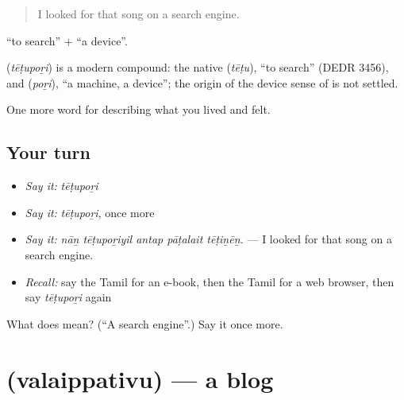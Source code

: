 \begin{quote}
I looked for that song on a search engine.
\end{quote}

 \textquotedblleft{}to search\textquotedblright{} +  \textquotedblleft{}a device\textquotedblright{}.

\begin{cousinweb}
\textbf{} (\emph{tēṭupoṟi}) is a modern compound: the native  (\emph{tēṭu}), \textquotedblleft{}to search\textquotedblright{} (DEDR 3456), and  (\emph{poṟi}), \textquotedblleft{}a machine, a device\textquotedblright{}; the origin of the device sense of  is not settled.
\end{cousinweb}

\begin{grammarlens}[title={What you've built}]
One more word for describing what you lived and felt.
\end{grammarlens}

\subsection*{Your turn}
\begin{itemize}
\raggedright
  \item \emph{Say it:} \emph{tēṭupoṟi}
  \item \emph{Say it:} \emph{tēṭupoṟi}, once more
  \item \emph{Say it:} \emph{nāṉ tēṭupoṟiyil antap pāṭalait tēṭiṉēṉ.} — I looked for that song on a search engine.
  \item \emph{Recall:} say the Tamil for an e-book, then the Tamil for a web browser, then say \emph{tēṭupoṟi} again
\end{itemize}

\begin{tcolorbox}[breakable,colback=teal!4,colframe=teal!35!black,title={Before you move on}]
What does  mean? (\textquotedblleft{}A search engine\textquotedblright{}.) Say it once more.
\end{tcolorbox}
\section[\texorpdfstring{\ta{வலைப்பதிவு} (valaippativu)}{வலைப்பதிவு (valaippativu)}]{ (valaippativu) — a blog}

\label{lesson:TA-C516-valaippativu}



